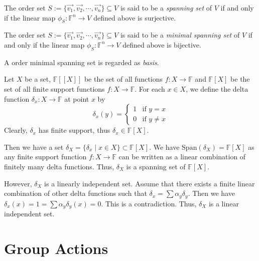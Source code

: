 \documentclass[
	11pt, %
	fleqn, %
	a4paper, %
]{LegrandOrangeBook}
\renewcommand{\span}[1]{\text{Span}(#1)} %
\newcommand{\F}{\mathbb{F}} %
\begin{document}
\begin{proposition}
    The order set $S := \{\vec{v_1}, \vec{v_2}, \cdots, \vec{v_n}\} \subseteq V$ is said to be a \emph{spanning set} of $V$ if and only if the linear map $\phi_S: \F^n \to V$ defined above is surjective.
\end{proposition}

\begin{proposition} \label{prop:minimal_spanning_set}
    The order set $S := \{\vec{v_1}, \vec{v_2}, \cdots, \vec{v_n}\} \subseteq V$ is said to be a \emph{minimal spanning set} of $V$ if and only if the linear map $\phi_S: \F^n \to V$ defined above is bijective.
\end{proposition}

\begin{remark}
    A order minimal spanning set is regarded as \emph{basis}.
\end{remark}

\begin{example}
    Let $X$ be a set, $\F[[X]]$ be the set of all functions $f: X \to \F$ and $\F[X]$ be the set of all finite support functions $f: X \to \F$. For each $x \in X$, we define the delta function $\delta_x : X \to \F$ at point $x$ by 
    \[
        \delta_x(y) = \begin{cases}
            1 & \text{if } y = x \\
            0 & \text{if } y \neq x
        \end{cases}
    \]
    Clearly, $\delta_x$ has finite support, thus $\delta_x \in \F[X]$.

    Then we have a set $\delta_X = \{\delta_x \mid x \in X\} \subset \F[X]$. We have $\span{\delta_X} = \F[X]$ as any finite support function $f: X \to \F$ can be written as a linear combination of finitely many delta functions. Thus, $\delta_X$ is a spanning set of $\F[X]$.

    However, $\delta_X$ is a linearly independent set. Assume that there exists a finite linear combination of other delta functions such that $\delta_x = \sum \alpha_y \delta_{y}$. Then we have $\delta_x(x) = 1 = \sum \alpha_y \delta_y(x) = 0$. This is a contradiction. Thus, $\delta_X$ is a linear independent set.
\end{example}

\newpage

\section{Group Actions}
\end{document}
